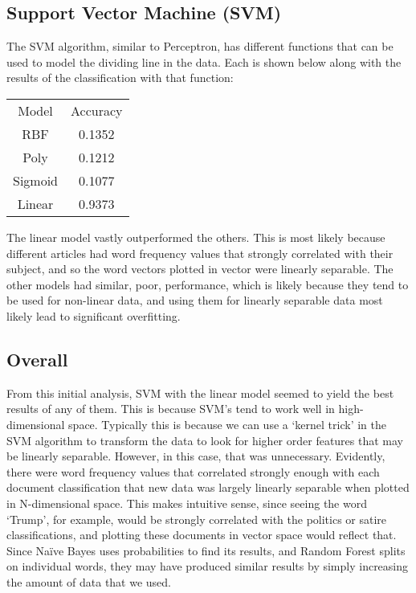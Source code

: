 \documentclass[fleqn,11pt]{article}
\begin{document}
\begin{multicols}{2}
        \subsection{Support Vector Machine (SVM)}
        The SVM algorithm, similar to Perceptron, has different functions that can be used to 
        model the dividing line in the data. Each is shown below along with the results of the 
        classification with that function:
        \begin{center}
            \begin{tabular}{|cc|}
                \hline
                Model   & Accuracy\\
                RBF     & 0.1352\\
                Poly    & 0.1212\\
                Sigmoid & 0.1077\\
                Linear  & 0.9373\\
                \hline
            \end{tabular}
        \end{center}
        The linear model vastly outperformed the others. This is most likely because different 
        articles had word frequency values that strongly correlated with their subject, and so 
        the word vectors plotted in vector were linearly separable. The other models had 
        similar, poor, performance, which is likely because they tend to be used for 
        non-linear data, and using them for linearly separable data most likely lead to 
        significant overfitting.
        \subsection{Overall}
        From this initial analysis, SVM with the linear model seemed to yield the best results 
        of any of them. This is because SVM’s tend to work well in high-dimensional space. 
        Typically this is because we can use a ‘kernel trick’ in the SVM algorithm to 
        transform the data to look for higher order features that may be linearly separable. 
        However, in this case, that was unnecessary. Evidently, there were word frequency 
        values that correlated strongly enough with each document classification that new data 
        was largely linearly separable when plotted in N-dimensional space. This makes 
        intuitive sense, since seeing the word ‘Trump’, for example, would be strongly 
        correlated with the politics or satire classifications, and plotting these documents 
        in vector space would reflect that. Since Naïve Bayes uses probabilities to find its 
        results, and Random Forest splits on individual words, they may have produced similar 
        results by simply increasing the amount of data that we used.
        

\end{multicols}
\end{document}
